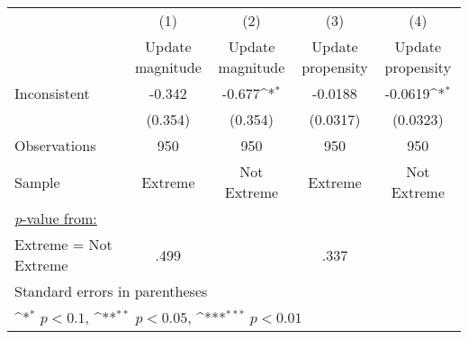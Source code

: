 {
\def\sym#1{\ifmmode^{#1}\else\(^{#1}\)\fi}
\begin{tabular}{l*{4}{c}}
\hline\hline
                    &\multicolumn{1}{c}{(1)}         &\multicolumn{1}{c}{(2)}         &\multicolumn{1}{c}{(3)}         &\multicolumn{1}{c}{(4)}         \\
                    &\shortstack{Update \\ magnitude}         &\shortstack{Update \\ magnitude}         &\shortstack{Update \\ propensity}         &\shortstack{Update \\ propensity}         \\
\hline
Inconsistent        &      -0.342         &      -0.677\sym{*}  &     -0.0188         &     -0.0619\sym{*}  \\
                    &     (0.354)         &     (0.354)         &    (0.0317)         &    (0.0323)         \\
\hline
Observations        &         950         &         950         &         950         &         950         \\
Sample              &     Extreme         & Not Extreme         &     Extreme         & Not Extreme         \\
\ul{\textit{p}-value from:}&                     &                     &                     &                     \\
Extreme = Not Extreme&        .499         &                     &        .337         &                     \\
\hline\hline
\multicolumn{5}{l}{\footnotesize Standard errors in parentheses}\\
\multicolumn{5}{l}{\footnotesize \sym{*} \(p<0.1\), \sym{**} \(p<0.05\), \sym{***} \(p<0.01\)}\\
\end{tabular}
}
